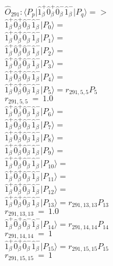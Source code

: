 \documentclass[14pt]{article}
\begin{document}
    $\hat{O}_{291}:  \langle{P_p}\vert \hat{1}_{\beta}^{+}\hat{0}_{\beta}^{+}\hat{0}_{\beta}^{-}\hat{1}_{\beta}^{-} \vert{P_q}\rangle => $ \\ 
    $ \hat{1}_{\beta}^{+}\hat{0}_{\beta}^{+}\hat{0}_{\beta}^{-}\hat{1}_{\beta}^{-} \vert{P_{0}}\rangle =  $ \\ 
    $ \hat{1}_{\beta}^{+}\hat{0}_{\beta}^{+}\hat{0}_{\beta}^{-}\hat{1}_{\beta}^{-} \vert{P_{1}}\rangle =  $ \\ 
    $ \hat{1}_{\beta}^{+}\hat{0}_{\beta}^{+}\hat{0}_{\beta}^{-}\hat{1}_{\beta}^{-} \vert{P_{2}}\rangle =  $ \\ 
    $ \hat{1}_{\beta}^{+}\hat{0}_{\beta}^{+}\hat{0}_{\beta}^{-}\hat{1}_{\beta}^{-} \vert{P_{3}}\rangle =  $ \\ 
    $ \hat{1}_{\beta}^{+}\hat{0}_{\beta}^{+}\hat{0}_{\beta}^{-}\hat{1}_{\beta}^{-} \vert{P_{4}}\rangle =  $ \\ 
    $ \hat{1}_{\beta}^{+}\hat{0}_{\beta}^{+}\hat{0}_{\beta}^{-}\hat{1}_{\beta}^{-} \vert{P_{5}}\rangle = {r}_{291,5,5}P_{5} $ \\ 
    ${r}_{291,5,5}\ =\ 1.0 $ \\ 
    $ \hat{1}_{\beta}^{+}\hat{0}_{\beta}^{+}\hat{0}_{\beta}^{-}\hat{1}_{\beta}^{-} \vert{P_{6}}\rangle =  $ \\ 
    $ \hat{1}_{\beta}^{+}\hat{0}_{\beta}^{+}\hat{0}_{\beta}^{-}\hat{1}_{\beta}^{-} \vert{P_{7}}\rangle =  $ \\ 
    $ \hat{1}_{\beta}^{+}\hat{0}_{\beta}^{+}\hat{0}_{\beta}^{-}\hat{1}_{\beta}^{-} \vert{P_{8}}\rangle =  $ \\ 
    $ \hat{1}_{\beta}^{+}\hat{0}_{\beta}^{+}\hat{0}_{\beta}^{-}\hat{1}_{\beta}^{-} \vert{P_{9}}\rangle =  $ \\ 
    $ \hat{1}_{\beta}^{+}\hat{0}_{\beta}^{+}\hat{0}_{\beta}^{-}\hat{1}_{\beta}^{-} \vert{P_{10}}\rangle =  $ \\ 
    $ \hat{1}_{\beta}^{+}\hat{0}_{\beta}^{+}\hat{0}_{\beta}^{-}\hat{1}_{\beta}^{-} \vert{P_{11}}\rangle =  $ \\ 
    $ \hat{1}_{\beta}^{+}\hat{0}_{\beta}^{+}\hat{0}_{\beta}^{-}\hat{1}_{\beta}^{-} \vert{P_{12}}\rangle =  $ \\ 
    $ \hat{1}_{\beta}^{+}\hat{0}_{\beta}^{+}\hat{0}_{\beta}^{-}\hat{1}_{\beta}^{-} \vert{P_{13}}\rangle = {r}_{291,13,13}P_{13} $ \\ 
    ${r}_{291,13,13}\ =\ 1.0 $ \\ 
    $ \hat{1}_{\beta}^{+}\hat{0}_{\beta}^{+}\hat{0}_{\beta}^{-}\hat{1}_{\beta}^{-} \vert{P_{14}}\rangle = {r}_{291,14,14}P_{14} $ \\ 
    ${r}_{291,14,14}\ =\ 1 $ \\ 
    $ \hat{1}_{\beta}^{+}\hat{0}_{\beta}^{+}\hat{0}_{\beta}^{-}\hat{1}_{\beta}^{-} \vert{P_{15}}\rangle = {r}_{291,15,15}P_{15} $ \\ 
    ${r}_{291,15,15}\ =\ 1 $ \\ 
    
\end{document}

